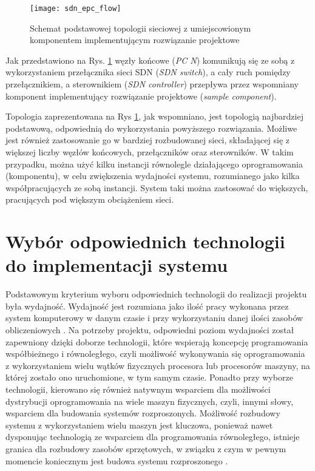 \begin{figure}[h]
\centering
\texttt{[image: sdn\_epc\_flow]}
\caption{Schemat podstawowej topologii sieciowej z umiejscowionym komponentem
  implementującym rozwiązanie projektowe}
\label{fig:sdn_epc_flow}
\end{figure}

Jak przedstawiono na Rys. \ref{fig:sdn_epc_flow} węzły końcowe
(\textit{PC N}) komunikują się ze sobą z wykorzystaniem przełącznika sieci SDN
(\textit{SDN switch}), a cały ruch pomiędzy przełącznikiem, a sterownikiem
(\textit{SDN controller}) przepływa przez wspomniany komponent implementujący
rozwiązanie projektowe (\textit{sample component}). 

Topologia zaprezentowana na Rys \ref{fig:sdn_epc_flow}, jak wspomniano, jest
topologią najbardziej podstawową, odpowiednią do wykorzystania powyższego
rozwiązania. Możliwe jest również zastosowanie go w bardziej
rozbudowanej sieci, składającej się z większej liczby węzłów końcowych, 
przełączników oraz sterowników. W takim przypadku, można użyć kilku instancji
równolegle działającego oprogramowania (komponentu), w celu zwiększenia
wydajności systemu, rozumianego jako kilka współpracujących ze sobą instancji.
System taki można zastosować do większych, pracujących pod większym obciążeniem
sieci.

\section{Wybór odpowiednich technologii do implementacji systemu}

Podstawowym kryterium wyboru odpowiednich technologii do realizacji projektu
była wydajność. Wydajność jest rozumiana jako ilość pracy wykonana przez system
komputerowy w danym czasie i przy wykorzystaniu danej ilości zasobów
obliczeniowych \cite{distrforfunandprof}. Na potrzeby projektu, odpowiedni
poziom wydajności został zapewniony dzięki doborze technologii, które wspierają
koncepcję programowania współbieżnego i równoległego, czyli możliwość
wykonywania się oprogramowania z wykorzystaniem wielu wątków fizycznych
procesora lub procesorów maszyny, na której zostało ono uruchomione, w tym samym
czasie. Ponadto przy wyborze technologii, kierowano się również natywnym
wsparciem dla możliwości dystrybucji oprogramowania na wiele maszyn fizycznych,
czyli, innymi słowy, wsparciem dla budowania systemów rozproszonych. Możliwość
rozbudowy systemu z wykorzystaniem wielu maszyn jest kluczowa, ponieważ nawet
dysponując technologią ze wsparciem dla programowania równoległego, istnieje
granica dla rozbudowy zasobów sprzętowych, w związku z czym w pewnym momencie
koniecznym jest budowa systemu rozproszonego \cite{distrforfunandprof}.

